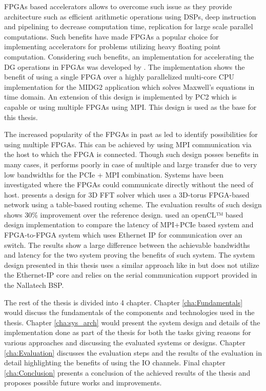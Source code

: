 FPGAs based accelerators allows to overcome such issue as they provide architecture
such as efficient arithmetic operations using DSPs, deep instruction and pipelining
to decrease computation time, replication for large scale parallel computations.
Such benefits have made FPGAs a popular choice for implementing accelerators for
problems utilizing heavy floating point computation. Considering such benefits,
an implementation for accelerating the \ac{DG} operations in FPGAs was
developed by \textcite{kenter_opencl-based_2018}. The implementation shows the benefit
of using a single FPGA over a highly parallelized multi-core CPU implementation for
the MIDG2 application which solves Maxwell’s equations in time domain. An extension
of this design is implemented by PC2 which is capable or using multiple FPGAs using MPI.
This design is used as the base for this thesis.

The increased popularity of the FPGAs in past as led to identify possibilities for
using multiple FPGAs. This can be achieved by using MPI communication via the host
to which the FPGA is connected. Though such design posses benefits in many cases,
it performs poorly in case of multiple and large transfer due to very low bandwidths
for the PCIe + MPI combination. Systems have been investigated where the FPGAs could
communicate directly without the need of host. \textcite{sheng_hpc_2017} presents a design
for 3D FFT solver which uses a 3D-torus FPGA-based network using a table-based routing
scheme. The evaluation results of such design shows 30\% improvement over the reference design.
\textcite{kobayashi_opencl-ready_2018} used an openCL™ based design implementation to
compare the latency of MPI+PCIe based system and FPGA-to-FPGA system which uses Ethernet
IP for communication over an switch. The results show a large difference between the achievable
bandwidths and latency for the two system proving the benefits of such system. The system
design presented in this thesis uses a similar approach like in \cite{kobayashi_opencl-ready_2018}
but does not utilize the Ethernet-IP core and relies on the serial communication
support provided in the Nallatech BSP.


The rest of the thesis is divided into 4 chapter. Chapter \ref{cha:Fundamentals} would
discuss the fundamentals of the components and technologies used in the thesis.
Chapter \ref{cha:sys_arch} would present the system design and details of the implementation
done as part of the thesis for both the tasks giving reasons for various approaches and discussing
the evaluated systems or designs. Chapter \ref{cha:Evaluation} discusses the evaluation steps
and the results of the evaluation in detail highlighting the benefits of using the IO channels.
Final chapter \ref{cha:Conclusion} presents a conclusion of the achieved results of the thesis
and proposes possible future works and improvements.